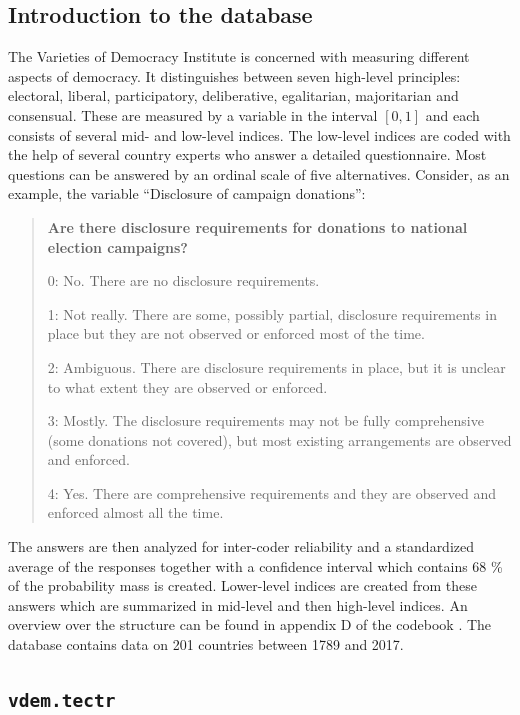 \documentclass[]{report}
\theoremstyle{definition}
\theoremstyle{definition}
\theoremstyle{definition}
\theoremstyle{remark}
\begin{document}
\subsection{Introduction to the
database}\label{introduction-to-the-database}

The Varieties of Democracy Institute is concerned with measuring
different aspects of democracy. It distinguishes between seven
high-level principles: electoral, liberal, participatory, deliberative,
egalitarian, majoritarian and consensual. These are measured by a
variable in the interval \([0,1]\) and each consists of several mid- and
low-level indices. The low-level indices are coded with the help of
several country experts who answer a detailed questionnaire. Most
questions can be answered by an ordinal scale of five alternatives.
Consider, as an example, the variable ``Disclosure of campaign
donations'':

\begin{quote}
\textbf{Are there disclosure requirements for donations to national
election campaigns?}

0: No. There are no disclosure requirements.

1: Not really. There are some, possibly partial, disclosure requirements
in place but they are not observed or enforced most of the time.

2: Ambiguous. There are disclosure requirements in place, but it is
unclear to what extent they are observed or enforced.

3: Mostly. The disclosure requirements may not be fully comprehensive
(some donations not covered), but most existing arrangements are
observed and enforced.

4: Yes. There are comprehensive requirements and they are observed and
enforced almost all the time.
\end{quote}

The answers are then analyzed for inter-coder reliability and a
standardized average of the responses together with a confidence
interval which contains 68 \% of the probability mass is created.
Lower-level indices are created from these answers which are summarized
in mid-level and then high-level indices. An overview over the structure
can be found in appendix D of the codebook \citep{vdem-codebook2018}.
The database contains data on 201 countries between 1789 and 2017.
\citep[\citet{Pemstein2018}]{vdem2018}

\subsection{\texorpdfstring{\texttt{vdem.tectr}}{vdem.tectr}}\label{vdem.tectr}
\end{document}
